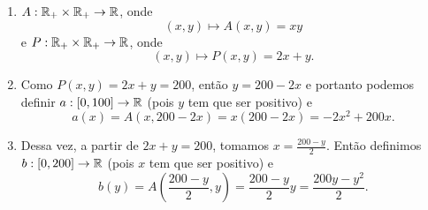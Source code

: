 \begin{enumerate}
	\item $A:\mathbb{R}_+\times\mathbb{R}_+\rightarrow\mathbb{R}$, onde
	\[
		(x,y)\mapsto A(x,y)=xy
	\]
	e $P:\mathbb{R}_+\times\mathbb{R}_+\rightarrow\mathbb{R}$, onde
	\[
		(x,y)\mapsto P(x,y)=2x+y.
	\]

	\item Como $P(x,y)=2x+y=200$, então $y=200-2x$ e portanto podemos definir
	$a:[0,100]\rightarrow\mathbb{R}$ (pois $y$ tem que ser positivo) e
	\[
		a(x)=A(x,200-2x)=x(200-2x)=-2x^2+200x.
	\]

	\item Dessa vez, a partir de $2x+y=200$, tomamos $x=\frac{200-y}{2}$.
	Então definimos $b:[0,200]\rightarrow\mathbb{R}$ (pois $x$ tem que ser positivo) e
	\[
		b(y)=A(\frac{200-y}{2},y)=\frac{200-y}{2}y=\frac{200y-y^2}{2}.
	\]
\end{enumerate}
